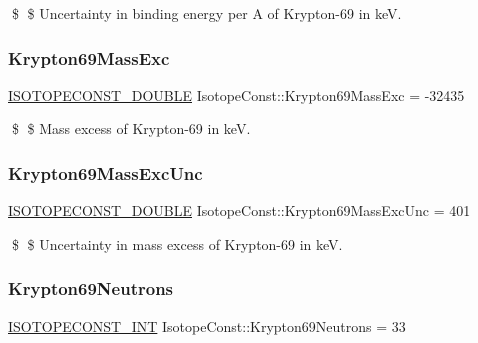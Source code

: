 \$ \$ Uncertainty in binding energy per A of Krypton-\/69 in keV. \mbox{\label{group___isotope_const-_krypton-_kr69_gac728498a5cc71630c23511b001d3847f}} 
\subsubsection{\texorpdfstring{Krypton69\+Mass\+Exc}{Krypton69MassExc}}
{\footnotesize\ttfamily \mbox{\hyperlink{group___isotope_const-_macros_ga8f45a7272ce02c0b4c65c44636ed719a}{I\+S\+O\+T\+O\+P\+E\+C\+O\+N\+S\+T\+\_\+\+D\+O\+U\+B\+LE}} Isotope\+Const\+::\+Krypton69\+Mass\+Exc = -\/32435}

\$ \$ Mass excess of Krypton-\/69 in keV. \mbox{\label{group___isotope_const-_krypton-_kr69_gace9a95b7b1a81e20e383529ccf1ebe35}} 
\subsubsection{\texorpdfstring{Krypton69\+Mass\+Exc\+Unc}{Krypton69MassExcUnc}}
{\footnotesize\ttfamily \mbox{\hyperlink{group___isotope_const-_macros_ga8f45a7272ce02c0b4c65c44636ed719a}{I\+S\+O\+T\+O\+P\+E\+C\+O\+N\+S\+T\+\_\+\+D\+O\+U\+B\+LE}} Isotope\+Const\+::\+Krypton69\+Mass\+Exc\+Unc = 401}

\$ \$ Uncertainty in mass excess of Krypton-\/69 in keV. \mbox{\label{group___isotope_const-_krypton-_kr69_ga7afee38fb60f20db1f87934ee04de721}} 
\subsubsection{\texorpdfstring{Krypton69\+Neutrons}{Krypton69Neutrons}}
{\footnotesize\ttfamily \mbox{\hyperlink{group___isotope_const-_macros_ga5f18360b3e99483a35c32d789e62621c}{I\+S\+O\+T\+O\+P\+E\+C\+O\+N\+S\+T\+\_\+\+I\+NT}} Isotope\+Const\+::\+Krypton69\+Neutrons = 33}

